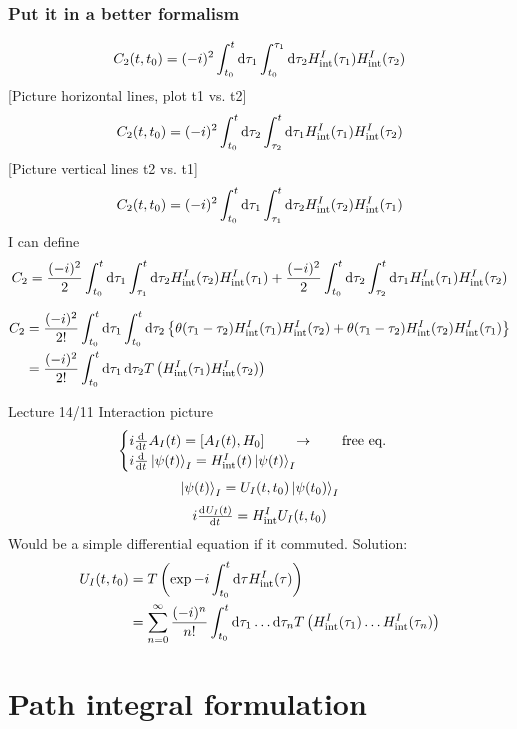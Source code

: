 \subsubsection{Put it in a better formalism}
\[ C_2(t,t_0) = (-i)^2\int^t_{t_0}\operatorname{d \!}{\tau_1}\int^{\tau_1}_{t_0}\operatorname{d \!}{\tau_2}H_\text{int}^I(\tau_1)H_\text{int}^I(\tau_2) \]
[Picture horizontal lines, plot t1 vs. t2]
\[ C_2(t,t_0) = (-i)^2\int^t_{t_0}\operatorname{d \!}{\tau_2}\int^{t}_{\tau_2}\operatorname{d \!}{\tau_1}H_\text{int}^I(\tau_1)H_\text{int}^I(\tau_2) \]
[Picture vertical lines t2 vs. t1]
\[ C_2(t,t_0) = (-i)^2\int^t_{t_0}\operatorname{d \!}{\tau_1}\int^{t}_{\tau_1}\operatorname{d \!}{\tau_2}H_\text{int}^I(\tau_2)H_\text{int}^I(\tau_1) \]
I can define
\[ C_2 = \frac{(-i)^2}{2}\int^t_{t_0}\operatorname{d \!}{\tau_1}\int^{t}_{\tau_1}\operatorname{d \!}{\tau_2}H_\text{int}^I(\tau_2)H_\text{int}^I(\tau_1) + \frac{(-i)^2}{2}\int^t_{t_0}\operatorname{d \!}{\tau_2}\int^{t}_{\tau_2}\operatorname{d \!}{\tau_1}H_\text{int}^I(\tau_1)H_\text{int}^I(\tau_2) \]

\begin{align*}
C_2 &= \frac{(-i)^2}{2!}\int^t_{t_0}\operatorname{d \!}{\tau_1}\int^{t}_{t_0}\operatorname{d \!}{\tau_2}\left\{\theta(\tau_1-\tau_2)H_\text{int}^I(\tau_1)H_\text{int}^I(\tau_2) + \theta(\tau_1-\tau_2)H_\text{int}^I(\tau_2)H_\text{int}^I(\tau_1)\right\} \\
&= \frac{(-i)^2}{2!}\int^t_{t_0}\operatorname{d \!}{\tau_1}\operatorname{d \!}{\tau_2}T\left(H_\text{int}^I(\tau_1)H_\text{int}^I(\tau_2)\right)
\end{align*}

Lecture 14/11
Interaction picture
\[ \begin{cases}
i \od{}{t}A_I(t) = \left[A_I(t),H_0\right] \qquad \to \qquad \text{free eq.} \\
i \od{}{t}\ket{\psi(t)}_I = H_\text{int}^I(t)\ket{\psi(t)}_I
\end{cases} \]
\[\left| \psi(t) \right\rangle_I = U_I(t,t_0)\left| \psi(t_0) \right\rangle_I  \]
\[ i \od{U_I(t)}{t} = H_\text{int}^IU_I(t,t_0) \]
Would be a simple differential equation if it commuted. Solution:
\begin{align*}
U_I(t,t_0) &= T \left(\exp{-i\int^t_{t_0}\operatorname{d \!}{\tau}H^I_\text{int}(\tau)}\right) \\
&= \sum^\infty_{n=0} \frac{(-i)^n}{n!}\int^t_{t_0}\operatorname{d \!}{\tau_1}\ldots \operatorname{d \!}{\tau_n}T \left(H_\text{int}^I(\tau_1)\ldots H_\text{int}^I(\tau_n)\right)
\end{align*}


\section{Path integral formulation}
